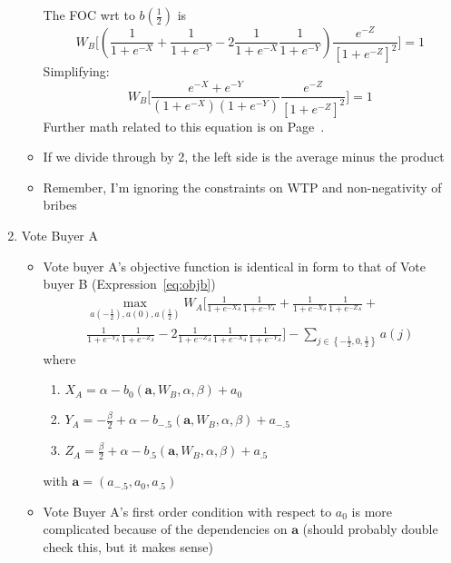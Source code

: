 \documentclass[12pt]{article}
\newcommand{\al}{\alpha}
\begin{document}
\begin{enumerate}
\begin{itemize}
			The FOC wrt to $b\left(\frac{1}{2}\right)$ is 
				\begin{equation}
					W_B \biggl[ \left( \frac{1}{1+e^{-X}} + \frac{1}{1+e^{-Y}} - 2 \frac{1}{1+e^{-X}} \frac{1}{1+e^{-Y}} \right) \frac{e^{-Z}}{\left[1+e^{-Z}\right]^2} \biggr]  = 1
				\end{equation}
			Simplifying:
				\begin{equation}
					W_B \biggl[ \frac{e^{-X} + e^{-Y}}{\left(1+e^{-X}\right)\left(1+e^{-Y}\right)} \frac{e^{-Z}}{\left[1+e^{-Z}\right]^2} \biggr]  = 1
					\label{eq:logistic}
				\end{equation}
			Further math related to this equation is on Page~\pageref{eq:logistic2}.
			\item If we divide through by 2, the left side is the average minus the product
			\item Remember, I'm ignoring the constraints on WTP and non-negativity of bribes
		\end{itemize}
	\item Vote Buyer A
		\begin{itemize}
			\item Vote buyer A's objective function is identical in form to that of Vote buyer B (Expression~\ref{eq:objb}) 
			  \begin{multline}
			    \max_{a\left(-\frac{1}{2}\right), a\left(0\right), a\left(\frac{1}{2}\right)} 
					W_A \biggl[ \frac{1}{1+e^{-X_A}} \frac{1}{1+e^{-Y_A}} +
					\frac{1}{1+e^{-X_A}} \frac{1}{1+e^{-Z_A}} + \\
					\frac{1}{1+e^{-Y_A}} \frac{1}{1+e^{-Z_A}} - 2	\frac{1}{1+e^{-Z_A}} \frac{1}{1+e^{-X_A}} \frac{1}{1+e^{-Y_A}} \biggr] - \sum_{j\in \left\{-\frac{1}{2}, 0,\frac{1}{2}\right\}} a(j)
					\label{eq:obja}
				\end{multline}
				where 
				\begin{enumerate}
					\item $X_A = \alpha - b_0(\bm{a},W_B,\al,\beta) + a_0$ 
					\item $Y_A = -\frac{\beta}{2} + \alpha - b_{-.5}\left(\bm{a},W_B,\al,\beta\right)+ a_{-.5}$
					\item $Z_A = \frac{\beta}{2} + \alpha - b_{.5}\left(\bm{a},W_B,\al,\beta\right)+ a_{.5}$
				\end{enumerate}
				with $\bm a = \left(a_{-.5},a_0,a_{.5} \right)$
			\item Vote Buyer A's first order condition with respect to $a_0$ is more complicated because of the dependencies on $\bm a$ (should probably double check this, but it makes sense)

\end{itemize}
\end{enumerate}
\end{document}
